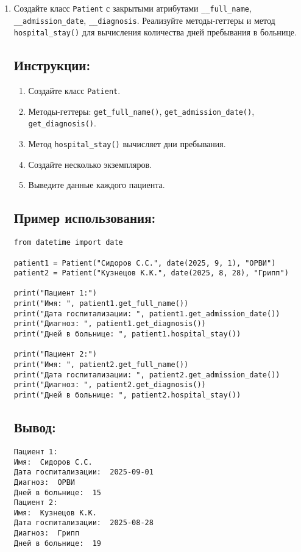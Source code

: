 \begin{enumerate}
\item
Создайте класс \texttt{Patient} с закрытыми атрибутами \texttt{\_\_full\_name}, \texttt{\_\_admission\_date}, \texttt{\_\_diagnosis}. Реализуйте методы-геттеры и метод \texttt{hospital\_stay()} для вычисления количества дней пребывания в больнице.

\subsection*{Инструкции:}
\begin{enumerate}
    \item Создайте класс \texttt{Patient}.
    \item Методы-геттеры: \texttt{get\_full\_name()}, \texttt{get\_admission\_date()}, \texttt{get\_diagnosis()}.
    \item Метод \texttt{hospital\_stay()} вычисляет дни пребывания.
    \item Создайте несколько экземпляров.
    \item Выведите данные каждого пациента.
\end{enumerate}

\subsection*{Пример использования:}
\begin{lstlisting}[caption=Пример кода]
from datetime import date

patient1 = Patient("Сидоров С.С.", date(2025, 9, 1), "ОРВИ")
patient2 = Patient("Кузнецов К.К.", date(2025, 8, 28), "Грипп")

print("Пациент 1:")
print("Имя: ", patient1.get_full_name())
print("Дата госпитализации: ", patient1.get_admission_date())
print("Диагноз: ", patient1.get_diagnosis())
print("Дней в больнице: ", patient1.hospital_stay())

print("Пациент 2:")
print("Имя: ", patient2.get_full_name())
print("Дата госпитализации: ", patient2.get_admission_date())
print("Диагноз: ", patient2.get_diagnosis())
print("Дней в больнице: ", patient2.hospital_stay())
\end{lstlisting}

\subsection*{Вывод:}
\begin{lstlisting}[caption=Ожидаемый вывод]
Пациент 1:
Имя:  Сидоров С.С.
Дата госпитализации:  2025-09-01
Диагноз:  ОРВИ
Дней в больнице:  15
Пациент 2:
Имя:  Кузнецов К.К.
Дата госпитализации:  2025-08-28
Диагноз:  Грипп
Дней в больнице:  19
\end{lstlisting}


\end{enumerate}
